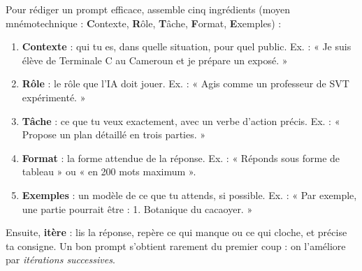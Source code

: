 \documentclass[11pt]{article}
\begin{document}
\begin{methode}
Pour rédiger un prompt efficace, assemble cinq ingrédients (moyen mnémotechnique : \textbf{C}ontexte, \textbf{R}ôle, \textbf{T}âche, \textbf{F}ormat, \textbf{E}xemples) :
\begin{enumerate}
\item \textbf{Contexte} : qui tu es, dans quelle situation, pour quel public. Ex. : « Je suis élève de Terminale C au Cameroun et je prépare un exposé. »
\item \textbf{Rôle} : le rôle que l'IA doit jouer. Ex. : « Agis comme un professeur de SVT expérimenté. »
\item \textbf{Tâche} : ce que tu veux exactement, avec un verbe d'action précis. Ex. : « Propose un plan détaillé en trois parties. »
\item \textbf{Format} : la forme attendue de la réponse. Ex. : « Réponds sous forme de tableau » ou « en 200 mots maximum ».
\item \textbf{Exemples} : un modèle de ce que tu attends, si possible. Ex. : « Par exemple, une partie pourrait être : 1. Botanique du cacaoyer. »
\end{enumerate}
Ensuite, \textbf{itère} : lis la réponse, repère ce qui manque ou ce qui cloche, et précise ta consigne. Un bon prompt s'obtient rarement du premier coup : on l'améliore par \emph{itérations successives}.
\end{methode}
\end{document}
